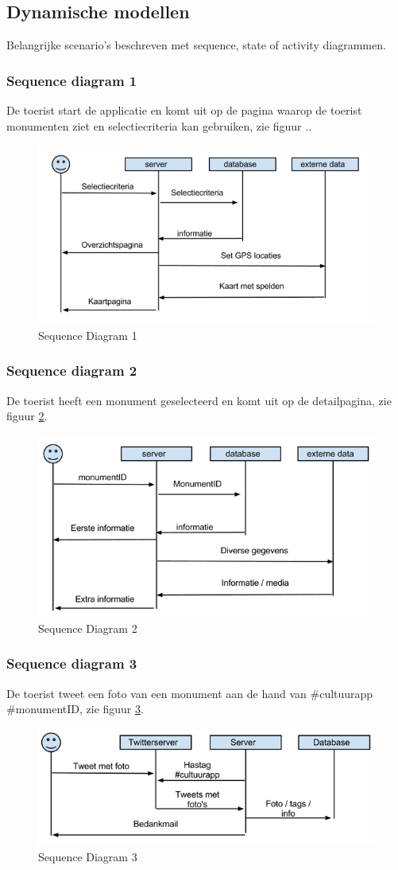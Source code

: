 \documentclass[a4paper,10pt]{article}
\newcommand{\rsubsection}[1]{
\subsection{#1}\label{sec:sub:#1}
}
\newcommand{\rsubsubsection}[1]{
\subsubsection{#1}\label{sec:sub:sub:#1}
}
\begin{document}
		\rsubsection{Dynamische modellen}
			Belangrijke scenario's beschreven met sequence, state of activity diagrammen.
			\rsubsubsection{Sequence diagram 1}
			De toerist start de applicatie en komt uit op de pagina waarop de toerist monumenten ziet en selectiecriteria kan gebruiken, zie figuur .. %
			\begin{figure}[ht!]
				\centering
				\includegraphics[width=\textwidth]{sequence1.png}
				\caption{Sequence Diagram 1 \label{sequence1}}
			\end{figure}
			\rsubsubsection{Sequence diagram 2}
			De toerist heeft een monument geselecteerd en komt uit op de detailpagina, zie figuur \ref{sequence2}.
			\begin{figure}[ht!]
				\centering
				\includegraphics[width=\textwidth]{sequence2.png}
				\caption{Sequence Diagram 2 \label{sequence2}}
			\end{figure}
			\rsubsubsection{Sequence diagram 3}
			De toerist tweet een foto van een monument aan de hand van \#cultuurapp \#monumentID, zie figuur \ref{sequence3}.
			\begin{figure}[ht!]
				\centering
				\includegraphics[width=\textwidth]{sequence3.png}
				\caption{Sequence Diagram 3 \label{sequence3}}
			\end{figure}
		
\end{document}
